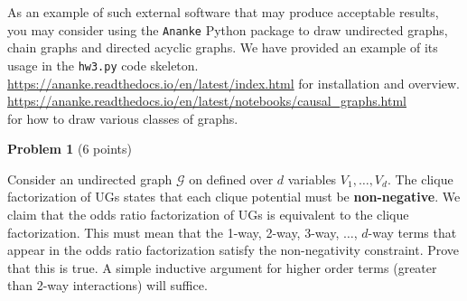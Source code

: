 \documentclass[letterpaper, 11pt]{article}
\newcommand{\G}{\mathcal{G}}
\begin{document}
    As an example of such external software that may produce acceptable results, you may consider using the \texttt{Ananke} Python package to draw undirected graphs, chain graphs and directed acyclic graphs. We have provided an example of its usage in the \texttt{hw3.py} code skeleton. \\[0.5 em]
    \url{https://ananke.readthedocs.io/en/latest/index.html} for installation and overview. \\
    \url{https://ananke.readthedocs.io/en/latest/notebooks/causal_graphs.html} \\for how to draw various classes of graphs.

\vspace{2em}

{\large\textbf{Problem 1}} (6 points)

Consider an undirected graph $\G$ on defined over $d$ variables $V_1, \dots, V_d$. The clique factorization of UGs states that each clique potential must be \textbf{non-negative}. We claim that the odds ratio factorization of UGs is equivalent to the clique factorization. This must mean that the 1-way, 2-way, 3-way, $\dots$, $d$-way terms that appear in the odds ratio factorization satisfy the non-negativity constraint. Prove that this is true. A simple inductive argument for higher order terms (greater than 2-way interactions) will suffice.
\end{document}
